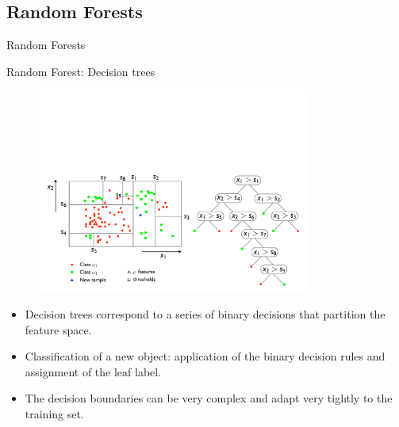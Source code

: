 \documentclass[xcolor=pdftex,dvipsnames,table]{beamer}
\begin{document}
\subsection{Random Forests}
\begin{frame}[plain,c]
\begin{center}
\Huge Random Forests
\end{center}
\end{frame}



\begin{frame}{Random Forest: Decision trees}
\begin{figure}[htb]
\includegraphics[width=0.8\textwidth]{../graphics/RF2.pdf}
\end{figure}
\begin{itemize}	
	\item Decision trees correspond to a series of binary decisions that partition the feature space.
	\item Classification of a new object: application of the binary decision rules and assignment of the leaf label.
	\item The decision boundaries can be very complex and adapt very tightly to the training set.
\end{itemize}
\end{frame}
\end{document}
